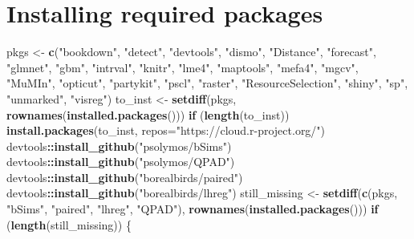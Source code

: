 \documentclass[12pt,]{book}
\newenvironment{Shaded}{\begin{snugshade}}{\end{snugshade}}
\newcommand{\ControlFlowTok}[1]{\textcolor[rgb]{0.13,0.29,0.53}{\textbf{#1}}}
\newcommand{\DataTypeTok}[1]{\textcolor[rgb]{0.13,0.29,0.53}{#1}}
\newcommand{\KeywordTok}[1]{\textcolor[rgb]{0.13,0.29,0.53}{\textbf{#1}}}
\newcommand{\NormalTok}[1]{#1}
\newcommand{\OperatorTok}[1]{\textcolor[rgb]{0.81,0.36,0.00}{\textbf{#1}}}
\newcommand{\StringTok}[1]{\textcolor[rgb]{0.31,0.60,0.02}{#1}}
\begin{document}
\hypertarget{installing-required-packages}{%
\section*{Installing required packages}\label{installing-required-packages}}

\begin{Shaded}
\begin{Highlighting}[]
\NormalTok{pkgs <-}\StringTok{ }\KeywordTok{c}\NormalTok{(}\StringTok{"bookdown"}\NormalTok{, }\StringTok{"detect"}\NormalTok{, }\StringTok{"devtools"}\NormalTok{, }\StringTok{"dismo"}\NormalTok{, }
  \StringTok{"Distance"}\NormalTok{, }\StringTok{"forecast"}\NormalTok{, }
  \StringTok{"glmnet"}\NormalTok{, }\StringTok{"gbm"}\NormalTok{, }\StringTok{"intrval"}\NormalTok{, }\StringTok{"knitr"}\NormalTok{, }\StringTok{"lme4"}\NormalTok{, }\StringTok{"maptools"}\NormalTok{, }\StringTok{"mefa4"}\NormalTok{, }
  \StringTok{"mgcv"}\NormalTok{, }\StringTok{"MuMIn"}\NormalTok{, }\StringTok{"opticut"}\NormalTok{, }\StringTok{"partykit"}\NormalTok{, }\StringTok{"pscl"}\NormalTok{, }\StringTok{"raster"}\NormalTok{, }
  \StringTok{"ResourceSelection"}\NormalTok{, }\StringTok{"shiny"}\NormalTok{, }\StringTok{"sp"}\NormalTok{, }\StringTok{"unmarked"}\NormalTok{, }\StringTok{"visreg"}\NormalTok{)}
\NormalTok{to_inst <-}\StringTok{ }\KeywordTok{setdiff}\NormalTok{(pkgs, }\KeywordTok{rownames}\NormalTok{(}\KeywordTok{installed.packages}\NormalTok{()))}
\ControlFlowTok{if}\NormalTok{ (}\KeywordTok{length}\NormalTok{(to_inst))}
  \KeywordTok{install.packages}\NormalTok{(to_inst, }\DataTypeTok{repos=}\StringTok{"https://cloud.r-project.org/"}\NormalTok{)}
\NormalTok{devtools}\OperatorTok{::}\KeywordTok{install_github}\NormalTok{(}\StringTok{"psolymos/bSims"}\NormalTok{)}
\NormalTok{devtools}\OperatorTok{::}\KeywordTok{install_github}\NormalTok{(}\StringTok{"psolymos/QPAD"}\NormalTok{)}
\NormalTok{devtools}\OperatorTok{::}\KeywordTok{install_github}\NormalTok{(}\StringTok{"borealbirds/paired"}\NormalTok{)}
\NormalTok{devtools}\OperatorTok{::}\KeywordTok{install_github}\NormalTok{(}\StringTok{"borealbirds/lhreg"}\NormalTok{)}
\NormalTok{still_missing <-}\StringTok{ }\KeywordTok{setdiff}\NormalTok{(}\KeywordTok{c}\NormalTok{(pkgs, }\StringTok{"bSims"}\NormalTok{, }\StringTok{"paired"}\NormalTok{, }\StringTok{"lhreg"}\NormalTok{, }\StringTok{"QPAD"}\NormalTok{), }
  \KeywordTok{rownames}\NormalTok{(}\KeywordTok{installed.packages}\NormalTok{()))}
\ControlFlowTok{if}\NormalTok{ (}\KeywordTok{length}\NormalTok{(still_missing)) \{}

\end{Highlighting}
\end{Shaded}
\end{document}
